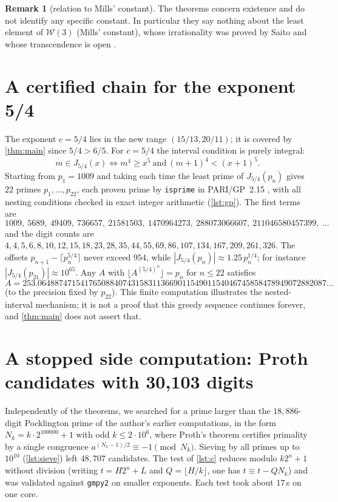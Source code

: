 \documentclass[11pt,a4paper]{article}
\theoremstyle{definition}
\newtheorem{remark}[theorem]{Remark}
\newcommand{\W}{\mathcal{W}}
\newcommand{\fl}[1]{\lfloor #1\rfloor}
\begin{document}
\begin{remark}[relation to Mills' constant]
The theorems concern existence and do not identify any specific constant. In particular they say nothing
about the least element of $\W(3)$ (Mills' constant), whose irrationality was proved by Saito
\cite{Sai25} and whose transcendence is open \cite{Sai25b}.
\end{remark}

\section{A certified chain for the exponent 5/4}\label{sec:numerics}

The exponent $c=5/4$ lies in the new range $(15/13,20/11)$; it is covered by \cref{thm:main} since $5/4>6/5$.
For $c=5/4$ the interval condition is purely integral:
\[
 m\in J_{5/4}(x)\iff m^4\ge x^5\ \text{and}\ (m+1)^4<(x+1)^5 .
\]
Starting from $p_1=1009$ and taking each time the least prime of $J_{5/4}(p_n)$ gives
$22$ primes $p_1,\dots,p_{22}$, each proven prime by \texttt{isprime} in PARI/GP~2.15 \cite{PARI}, with all
nesting conditions checked in exact integer arithmetic (\cref{lst:gp}). The first terms are
\[
 1009,\ 5689,\ 49409,\ 736657,\ 21581503,\ 1470964273,\ 288073066607,\ 211046580457399,\ \dots
\]
and the digit counts are $4,4,5,6,8,10,12,15,18,23,28,35,44,55,69,86,107,134,167,209,261,326$.
The offsets $p_{n+1}-\lceil p_n^{5/4}\rceil$ never exceed $954$, while $|J_{5/4}(p_n)|\approx1.25\,p_n^{1/4}$;
for instance $|J_{5/4}(p_{21})|\approx 10^{65}$. Any $A$ with $\fl{A^{(5/4)^n}}=p_n$ for $n\le22$ satisfies
\[
 A=253.06488747154176508840743158311366901154901154046745858478949072882087\ldots
\]
(to the precision fixed by $p_{22}$). This finite computation illustrates the nested-interval mechanism; it is
not a proof that this greedy sequence continues forever, and \cref{thm:main} does not assert that.

\appendix
\section{A stopped side computation: Proth candidates with 30{,}103 digits}\label{app:proth}

Independently of the theorems, we searched for a prime larger than the $18{,}886$-digit Pocklington prime of the
author's earlier computations, in the form $N_k=k\cdot2^{100000}+1$ with odd $k\le2\cdot10^6$, where Proth's theorem
certifies primality by a single congruence $a^{(N_k-1)/2}\equiv-1\pmod{N_k}$. Sieving by all primes up to $10^{10}$
(\cref{lst:sieve}) left $48{,}707$ candidates. The test of \cref{lst:c} reduces modulo $k2^{n}+1$ without division
(writing $t=H2^{n}+L$ and $Q=\lfloor H/k\rfloor$, one has $t\equiv t-Q N_k$) and was validated against
\texttt{gmpy2} on smaller exponents. Each test took about $17$\,s on one core.
\end{document}
